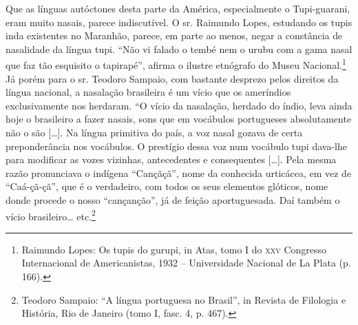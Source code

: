 Que as línguas autóctones desta parte da América, especialmente o
Tupi-guarani, eram muito nasais, parece indiscutível. O sr. Raimundo
Lopes, estudando os tupis inda existentes no Maranhão, parece, em parte
ao menos, negar a constância de nasalidade da língua tupi. ``Não vi
falado o tembé nem o urubu com a gama nasal que faz tão esquisito o
tapirapé'', afirma o ilustre etnógrafo do Museu Nacional.\footnote{Raimundo Lopes: Os tupis do gurupi, in Atas, tomo I do \textsc{xxv} Congresso
Internacional de Americanistas, 1932 -- Universidade Nacional de La
Plata (p. 166).} Já porém
para o sr. Teodoro Sampaio, com bastante desprezo pelos direitos da
língua nacional, a nasalação brasileira é um vício que os ameríndios
exclusivamente nos herdaram. ``O vício da nasalação, herdado do índio,
leva ainda hoje o brasileiro a fazer nasais, sons que em vocábulos
portugueses absolutamente não o são {[}\ldots{}{]}. Na língua primitiva do
país, a voz nasal gozava de certa preponderância nos vocábulos. O
prestígio dessa voz num vocábulo tupi dava-lhe para modificar as vozes
vizinhas, antecedentes e consequentes {[}\ldots{}{]}. Pela mesma razão
pronunciava o indígena ``Cançãçã'', nome da conhecida urticácea, em vez
de ``Caá-çã-çã'', que é o verdadeiro, com todos os seus elementos
glóticos, nome donde procede o nosso ``cançanção'', já de feição
aportuguesada. Daí também o vício brasileiro\ldots{} etc.\footnote{Teodoro Sampaio: ``A língua portuguesa no Brasil'', in Revista de
Filologia e História, Rio de Janeiro (tomo I, fasc. 4, p. 467).}

